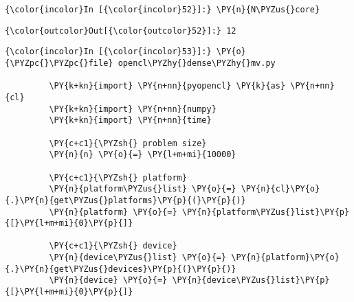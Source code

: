     \begin{Verbatim}[commandchars=\\\{\}]
{\color{incolor}In [{\color{incolor}52}]:} \PY{n}{N\PYZus{}core}
\end{Verbatim}

            \begin{Verbatim}[commandchars=\\\{\}]
{\color{outcolor}Out[{\color{outcolor}52}]:} 12
\end{Verbatim}
        








    \begin{Verbatim}[commandchars=\\\{\}]
{\color{incolor}In [{\color{incolor}53}]:} \PY{o}{\PYZpc{}\PYZpc{}file} opencl\PYZhy{}dense\PYZhy{}mv.py
         
         \PY{k+kn}{import} \PY{n+nn}{pyopencl} \PY{k}{as} \PY{n+nn}{cl}
         \PY{k+kn}{import} \PY{n+nn}{numpy}
         \PY{k+kn}{import} \PY{n+nn}{time}
         
         \PY{c+c1}{\PYZsh{} problem size}
         \PY{n}{n} \PY{o}{=} \PY{l+m+mi}{10000}
         
         \PY{c+c1}{\PYZsh{} platform}
         \PY{n}{platform\PYZus{}list} \PY{o}{=} \PY{n}{cl}\PY{o}{.}\PY{n}{get\PYZus{}platforms}\PY{p}{(}\PY{p}{)}
         \PY{n}{platform} \PY{o}{=} \PY{n}{platform\PYZus{}list}\PY{p}{[}\PY{l+m+mi}{0}\PY{p}{]}
         
         \PY{c+c1}{\PYZsh{} device}
         \PY{n}{device\PYZus{}list} \PY{o}{=} \PY{n}{platform}\PY{o}{.}\PY{n}{get\PYZus{}devices}\PY{p}{(}\PY{p}{)}
         \PY{n}{device} \PY{o}{=} \PY{n}{device\PYZus{}list}\PY{p}{[}\PY{l+m+mi}{0}\PY{p}{]}
         

\end{Verbatim}
